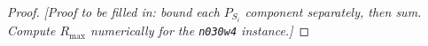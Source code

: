 \documentclass[11pt]{article}
\begin{document}
%
%


\begin{proof}
  \textit{[Proof to be filled in: bound each $P_{S_i}$ component separately,
  then sum. Compute $R_{\max}$ numerically for the \texttt{n030w4} instance.]}
\end{proof}
\end{document}
